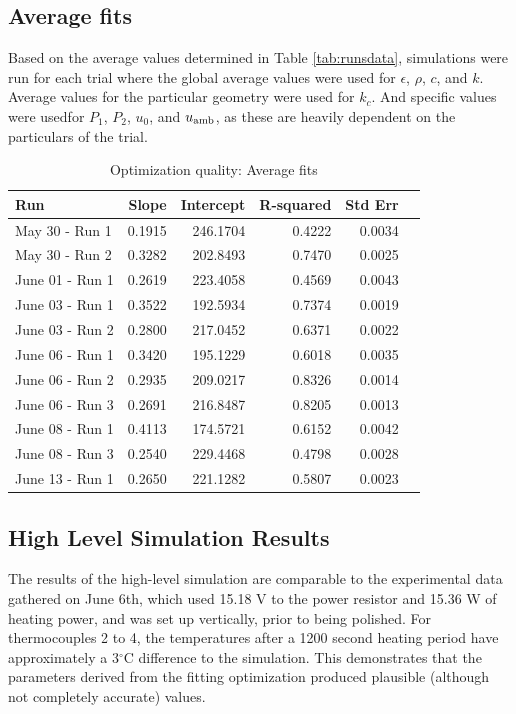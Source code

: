 \documentclass[letterpaper,titlepage,oneside]{report}
\begin{document}
\subsection*{Average fits}
Based on the average values determined in Table \ref{tab:runsdata},
simulations were run for each trial where the global average values
were used for ${\epsilon}$, ${\rho}$, ${c}$, and ${k}$.
Average values for the particular geometry were used for $k_c$. And
specific values were usedfor ${P_1}$, ${P_2}$, ${u_0}$,
and ${u_{\rm{amb}}}$, as these are heavily dependent on the particulars
of the trial.

\begin{table}[H]
  \caption{Optimization quality: Average fits}
  \label{tab:optavg}
  \centering
  \begin{tabularx}{0.75\textwidth}{|X|r|r|r|r|r|}
    \hline
    Run & Slope & Intercept & R-squared & Std Err \\
    \hline
    May  30 - Run 1   &   0.1915   & 246.1704   &    0.4222   &   0.0034 \\
    May  30 - Run 2   &   0.3282   & 202.8493   &    0.7470   &   0.0025 \\
    June 01 - Run 1   &   0.2619   & 223.4058   &    0.4569   &   0.0043 \\
    June 03 - Run 1   &   0.3522   & 192.5934   &    0.7374   &   0.0019 \\
    June 03 - Run 2   &   0.2800   & 217.0452   &    0.6371   &   0.0022 \\
    June 06 - Run 1   &   0.3420   & 195.1229   &    0.6018   &   0.0035 \\
    June 06 - Run 2   &   0.2935   & 209.0217   &    0.8326   &   0.0014 \\
    June 06 - Run 3   &   0.2691   & 216.8487   &    0.8205   &   0.0013 \\
    June 08 - Run 1   &   0.4113   & 174.5721   &    0.6152   &   0.0042 \\
    June 08 - Run 3   &   0.2540   & 229.4468   &    0.4798   &   0.0028 \\
    June 13 - Run 1   &   0.2650   & 221.1282   &    0.5807   &   0.0023 \\
    \hline
  \end{tabularx}
\end{table}

\subsection*{High Level Simulation Results}
The results of the high-level simulation are comparable to the
experimental data gathered on June 6th, which used 15.18 V
to the power resistor and 15.36 W of heating power, and was set
up vertically, prior to being polished. For thermocouples 2 to
4, the temperatures after a 1200 second heating period have
approximately a 3$^{\circ}$C difference to the simulation.
This demonstrates that the parameters derived from the fitting
optimization produced plausible (although not completely
accurate) values.
\end{document}
